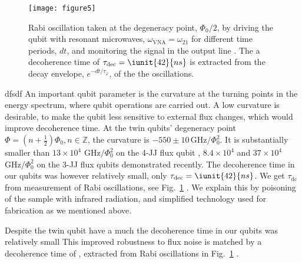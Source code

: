  \begin{figure}[h!]
   \texttt{[image: figure5]}
   \caption{Rabi oscillation taken  at the degeneracy point,  $ \Phi_0/2 $, by  driving the qubit
     with  resonant  microwaves,  $\omega_{\text{VNA}}  =   \omega_{21}$  for  different  time  periods,
     $ dt $, and monitoring the signal in the output line \cite{rabi}.  The a decoherence time
     of  $  \tau_{\text{dec}}   =  \iunit{42}{ns}  $  is  extracted  from   the  decay  envelope,
     $ e^{-dt/\tau_\varphi} $, of the the oscillations. \label{fig:rabi}}
 \end{figure}
 dfsdf An  important qubit  parameter is  the curvature at  the turning  points in  the energy
 spectrum, where qubit operations are carried out.   A low curvature is desirable, to make the
 qubit less sensitive to external flux changes,  which would improve decoherence time.  At the
 twin qubits' degeneracy  point $ \Phi =  (n + \frac{1}{2})\Phi_0, n\in\mathbb{Z} $,  the curvature is
 $   -550\pm10\,\text{GHz}/\Phi_0^2  $.    It  is   substantially  smaller   than  $   13\times  10^4$
 $ \text{GHz}/\Phi_0^2$ on the 4-JJ flux qubit \cite{stern2014}, $ 8.4 \times 10^4$ \cite{zhu2010} and
 $ 37\times 10^{4}$ $ \text{GHz}/\Phi_0^2$ \cite{gustavsson2012}  on the 3-JJ flux qubits demonstrated
 recently.   The  decoherence   time  in  our  qubits  was  however   relatively  small,  only
 $  \tau_\text{dec}  =  \iunit{42}{ns}  $.   We   get  $\tau_\text{dc}$  from  measurement  of  Rabi
 oscillations,  see Fig.~\ref{fig:rabi}  \cite{rabi}.  We  explain  this by  poisoning of  the
 sample  with  infrared radiation,  and  simplified  technology  used  for fabrication  as  we
 mentioned above.

 Despite the twin  qubit have a much the  decoherence time in our qubits  was relatively small
 This improved robustness to  flux noise is matched by a decoherence time  of , extracted from
 Rabi oscillations in Fig.~\ref{fig:rabi} \cite{rabi}.

